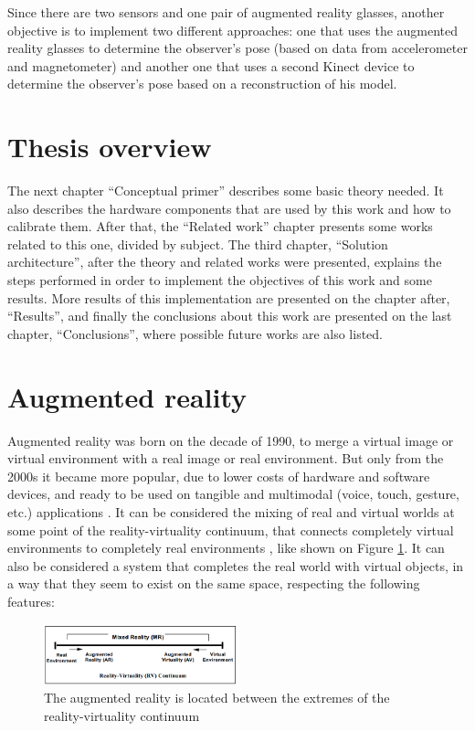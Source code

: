 \documentclass[msc, a4paper, classic, en]{ufbathesis}
\begin{document}
Since there are two sensors and one pair of augmented reality glasses, another objective is to implement two different approaches: one that
uses the augmented reality glasses to determine the observer's pose (based on data from accelerometer and magnetometer) and another one that uses a second Kinect device to determine the observer's pose based on a reconstruction of his model.

\section{Thesis overview}

The next chapter ``Conceptual primer'' describes some basic theory needed. It also describes the hardware components that are used by this work and how to calibrate them. After that, the ``Related work'' chapter presents some works related to this one, divided by subject. The third chapter, ``Solution architecture'', after the theory and related works were presented, explains the steps performed in order to implement the objectives of this work and some results. More results of this implementation are presented on the chapter after, ``Results'', and finally the conclusions about this work are presented on the last chapter, ``Conclusions'', where possible future works are also listed.

\section{Augmented reality}

Augmented reality was born on the decade of 1990, to merge a virtual image or virtual environment with a real image or real environment. But only from the 2000s it became more popular, due to lower costs of hardware and software devices, and ready to be used on tangible and multimodal (voice, touch, gesture, etc.) applications \cite{paddle}. It can be considered the mixing of real and virtual worlds at some point of the reality-virtuality continuum, that connects completely virtual environments to completely real environments \cite{milgram94}, like shown on Figure \ref{fig:cont}. It can also be considered a system that completes the real world with virtual objects, in a way that they seem to exist on the same space, respecting the following features:

\begin{figure}
\centering
\includegraphics[width=0.5\textwidth]{images/cont.png}
\caption{The augmented reality is located between the extremes of the reality-virtuality continuum \cite{milgram94}}
\label{fig:cont}
\end{figure}
\end{document}
